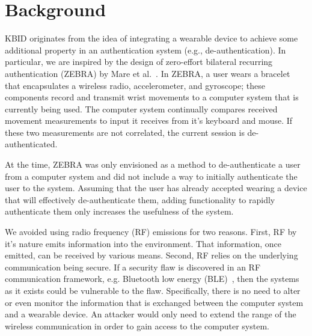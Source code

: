 \section{Background}\label{sec:background}
KBID originates from the idea of integrating a wearable device to achieve some additional property in an authentication system (e.g., de-authentication). In particular, we are inspired by the design of zero-effort bilateral recurring authentication (ZEBRA) by Mare et al.~\cite{mare:zebra:2014}. In ZEBRA, a user wears a bracelet that encapsulates a wireless radio, accelerometer, and gyroscope; these components record and transmit wrist movements to a computer system that is currently being used. The computer system continually compares received movement measurements to input it receives from it's keyboard and mouse. If these two measurements are not correlated, the current session is de-authenticated. 

At the time, ZEBRA was only envisioned as a method to de-authenticate a user from a computer system and did not include a way to initially authenticate the user to the system.  Assuming that the user has already accepted wearing a device that will effectively de-authenticate them, adding functionality to rapidly authenticate them only increases the usefulness of the system.

We avoided using radio frequency (RF) emissions for two reasons.  First, RF by it's nature emits information into the environment.  That information, once emitted, can be received by various means.  Second, RF relies on the underlying communication being secure.  If a security flaw is discovered in an RF communication framework, e.g. Bluetooth low energy (BLE)~\cite{BLEATTACK}, then the systems as it exists could be vulnerable to the flaw.  Specifically, there is no need to alter or even monitor the information that is exchanged between the computer system and a wearable device.  An attacker would only need to extend the range of the wireless communication in order to gain access to the computer system.



